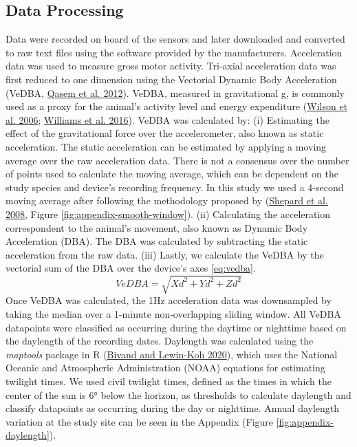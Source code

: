 \documentclass[msc,numbers,hidelinks]{coppe}
\begin{document}
  \hypertarget{data-processing}{%
  \subsection{Data Processing}\label{data-processing}}

  Data were recorded on board of the sensors and later downloaded and converted to raw text files using the software provided by the manufacturers. Acceleration data was used to measure gross motor activity. Tri-axial acceleration data was first reduced to one dimension using the Vectorial Dynamic Body Acceleration (VeDBA, \protect\hyperlink{ref-qasem2012}{Qasem et al. 2012}). VeDBA, measured in gravitational g, is commonly used as a proxy for the animal's activity level and energy expenditure (\protect\hyperlink{ref-wilson2006}{Wilson et al. 2006}; \protect\hyperlink{ref-williams2016}{Williams et al. 2016}). VeDBA was calculated by: (i) Estimating the effect of the gravitational force over the accelerometer, also known as static acceleration. The static acceleration can be estimated by applying a moving average over the raw acceleration data. There is not a consensus over the number of points used to calculate the moving average, which can be dependent on the study species and device's recording frequency. In this study we used a 4-second moving average after following the methodology proposed by (\protect\hyperlink{ref-shepard2008}{Shepard et al. 2008}, Figure \ref{fig:appendix-smooth-window}). (ii) Calculating the acceleration correspondent to the animal's movement, also known as Dynamic Body Acceleration (DBA). The DBA was calculated by subtracting the static acceleration from the raw data. (iii) Lastly, we calculate the VeDBA by the vectorial sum of the DBA over the device's axes \eqref{eq:vedba}.
  \begin{equation}
  VeDBA = \sqrt{Xd^2 + Yd^2 + Zd^2} \label{eq:vedba}
  \end{equation}
  Once VeDBA was calculated, the 1Hz acceleration data was downsampled by taking the median over a 1-minute non-overlapping sliding window. All VeDBA datapoints were classified as occurring during the daytime or nighttime based on the daylength of the recording dates. Daylength was calculated using the \emph{maptools} package in R (\protect\hyperlink{ref-bivand2020}{Bivand and Lewin-Koh 2020}), which uses the National Oceanic and Atmospheric Administration (NOAA) equations for estimating twilight times. We used civil twilight times, defined as the times in which the center of the sun is 6° below the horizon, as thresholds to calculate daylength and classify datapoints as occurring during the day or nighttime. Annual daylength variation at the study site can be seen in the Appendix (Figure \ref{fig:appendix-daylength}).
\end{document}
